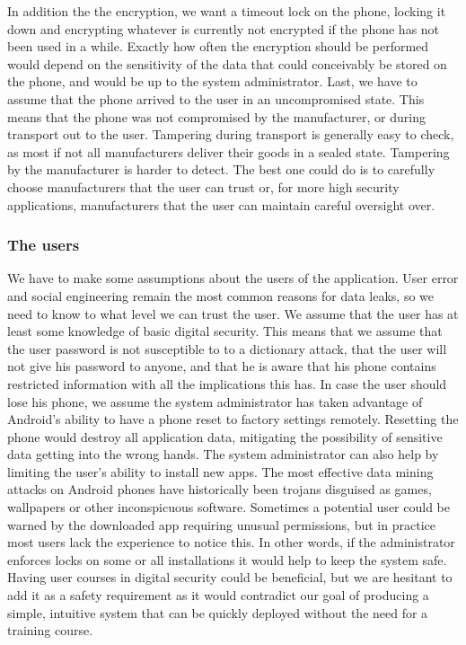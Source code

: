 In addition the the encryption, we want a timeout lock on the phone, locking it down and encrypting whatever is currently not encrypted if the phone has not been used in a while. Exactly how often the encryption should be performed would depend on the sensitivity of the data that could conceivably be stored on the phone, and would be up to the system administrator.
Last, we have to assume that the phone arrived to the user in an uncompromised state. This means that the phone was not compromised by the manufacturer, or during transport out to the user. Tampering during transport is generally easy to check, as most if not all manufacturers deliver their goods in a sealed state. Tampering by the manufacturer is harder to detect. The best one could do is to carefully choose manufacturers that the user can trust or, for more high security applications, manufacturers that the user can maintain careful oversight over.

\subsubsection{The users}
We have to make some assumptions about the users of the application. User error and social engineering remain the most common reasons for data leaks, so we need to know to what level we can trust the user.
\newline
\newline
We assume that the user has at least some knowledge of basic digital security. This means that we assume that the user password is not susceptible to to a dictionary attack, that the user will not give his password to anyone, and that he is aware that his phone contains restricted information with all the implications this has. 
\newline
\newline
In case the user should lose his phone, we assume the system administrator has taken advantage of Android’s ability to have a phone reset to factory settings remotely. Resetting the phone would destroy  all application data, mitigating the possibility of sensitive data getting into the wrong hands.
\newline
\newline
The system administrator can also help by limiting the user’s ability to install new apps. The most effective data mining attacks on Android phones have historically been trojans disguised as games, wallpapers or other inconspicuous software. Sometimes a potential user could be warned by the downloaded app requiring unusual permissions, but in practice most users lack the experience to notice this. In other words, if the administrator enforces locks on some or all installations it would help to keep the system safe.
\newline
\newline
Having user courses in digital security could be beneficial, but we are hesitant to add it as a safety requirement as it would contradict our goal of producing a simple, intuitive system that can be quickly deployed without the need for a training course. 

